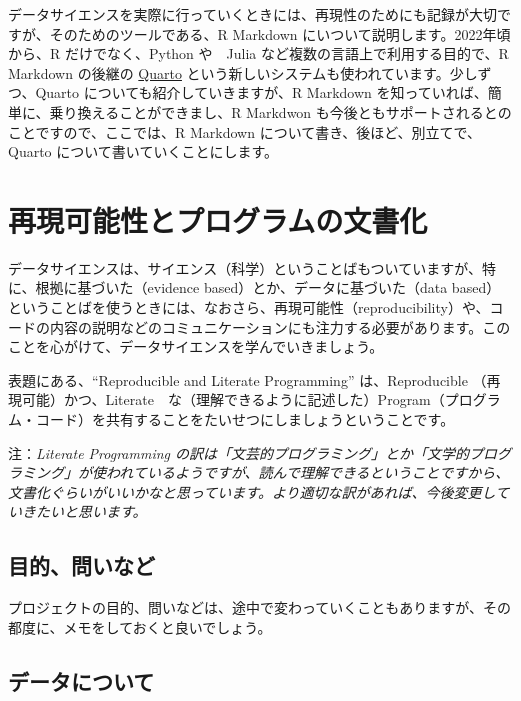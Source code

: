 \documentclass[
  xelatex, ja=standard]{bxjsbook}
\theoremstyle{definition}
\theoremstyle{definition}
\theoremstyle{definition}
\theoremstyle{definition}
\theoremstyle{remark}
\begin{document}
データサイエンスを実際に行っていくときには、再現性のためにも記録が大切ですが、そのためのツールである、R Markdown にいついて説明します。2022年頃から、R だけでなく、Python や　Julia など複数の言語上で利用する目的で、R Markdown の後継の \href{https://quarto.org}{Quarto} という新しいシステムも使われています。少しずつ、Quarto についても紹介していきますが、R Markdown を知っていれば、簡単に、乗り換えることができまし、R Markdwon も今後ともサポートされるとのことですので、ここでは、R Markdown について書き、後ほど、別立てで、Quarto について書いていくことにします。

\hypertarget{ux518dux73feux53efux80fdux6027ux3068ux30d7ux30edux30b0ux30e9ux30e0ux306eux6587ux66f8ux5316}{%
\section{再現可能性とプログラムの文書化}\label{ux518dux73feux53efux80fdux6027ux3068ux30d7ux30edux30b0ux30e9ux30e0ux306eux6587ux66f8ux5316}}

データサイエンスは、サイエンス（科学）ということばもついていますが、特に、根拠に基づいた（evidence based）とか、データに基づいた（data based）ということばを使うときには、なおさら、再現可能性（reproducibility）や、コードの内容の説明などのコミュニケーションにも注力する必要があります。このことを心がけて、データサイエンスを学んでいきましょう。

表題にある、``Reproducible and Literate Programming'' は、Reproducible （再現可能）かつ、Literate　な（理解できるように記述した）Program（プログラム・コード）を共有することをたいせつにしましょうということです。

注：\emph{Literate Programming の訳は「文芸的プログラミング」とか「文学的プログラミング」が使われているようですが、読んで理解できるということですから、文書化ぐらいがいいかなと思っています。より適切な訳があれば、今後変更していきたいと思います。}

\hypertarget{ux76eeux7684ux554fux3044ux306aux3069}{%
\subsection{目的、問いなど}\label{ux76eeux7684ux554fux3044ux306aux3069}}

プロジェクトの目的、問いなどは、途中で変わっていくこともありますが、その都度に、メモをしておくと良いでしょう。

\hypertarget{ux30c7ux30fcux30bfux306bux3064ux3044ux3066}{%
\subsection{データについて}\label{ux30c7ux30fcux30bfux306bux3064ux3044ux3066}}
\end{document}
